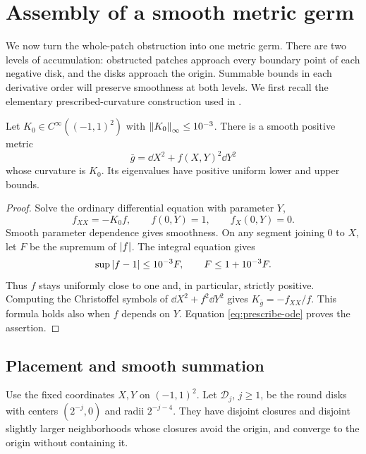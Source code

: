 \section{Assembly of a smooth metric germ}\label{sec:assembly}

We now turn the whole-patch obstruction into one metric germ.
There are two levels of accumulation: obstructed patches approach
every boundary point of each negative disk, and the disks approach
the origin. Summable bounds in each derivative order will preserve
smoothness at both levels.
We first recall the elementary prescribed-curvature construction
used in \cite[p.~453]{Khuri2009}.

\begin{lemma}\label{lem:prescribe}
Let \(K_0\in C^\infty((-1,1)^2)\) with
\(\left\lVert K_0\right\rVert_\infty\le10^{-3}\).
There is a smooth positive metric
\[
\bar g=\dd X^2+f(X,Y)^2\dd Y^2
\]
whose curvature is \(K_0\). Its eigenvalues have positive uniform
lower and upper bounds.
\end{lemma}

\begin{proof}
Solve the ordinary differential equation with parameter \(Y\),
\begin{equation}\label{eq:prescribe-ode}
f_{XX}=-K_0f,\qquad f(0,Y)=1,\qquad f_X(0,Y)=0.
\end{equation}
Smooth parameter dependence gives smoothness. On any segment
joining \(0\) to \(X\), let \(F\) be the supremum of \(\left\lvert f\right\rvert\).
The integral equation gives
\[
\sup\left\lvert f-1\right\rvert\le10^{-3}F,\qquad F\le1+10^{-3}F.
\]
Thus \(f\) stays uniformly close to one and, in particular,
strictly positive. Computing the Christoffel symbols of
\(\dd X^2+f^2\dd Y^2\) gives \(K_{\bar g}=-f_{XX}/f\).
This formula holds also when \(f\) depends on \(Y\).
Equation \eqref{eq:prescribe-ode} proves the assertion.
\end{proof}

\subsection{Placement and smooth summation}

Use the fixed coordinates \(X,Y\) on \((-1,1)^2\).
Let \(\mathcal D_j\), \(j\ge1\), be the round disks with centers
\((2^{-j},0)\) and radii \(2^{-j-4}\).
They have disjoint closures and disjoint slightly larger
neighborhoods whose closures avoid the origin, and converge to the
origin without containing it.


